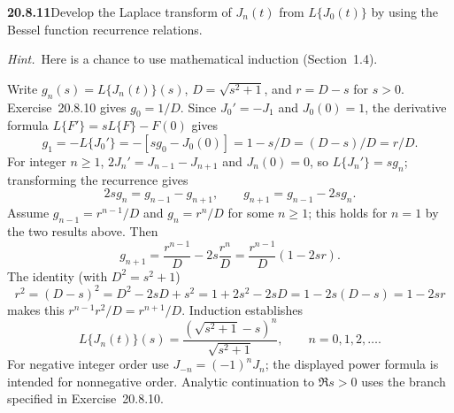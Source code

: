 \par\bigskip
\noindent\textbf{20.8.11}\quad Develop the Laplace transform of
$J_{n}(t)$ from $L\{J_{0}(t)\}$ by using the Bessel function
recurrence relations.
\par\emph{Hint.}~Here is a chance to use mathematical induction
(Section~1.4).
\par{}
\solution
Write $g_n(s)=L\{J_n(t)\}(s)$,
$D=\sqrt{s^2+1}$, and $r=D-s$ for $s>0$.
Exercise~20.8.10 gives $g_0=1/D$. Since $J_0'=-J_1$ and
$J_0(0)=1$, the derivative formula
$L\{F'\}=sL\{F\}-F(0)$ gives
\[
g_1=-L\{J_0'\}=-[sg_0-J_0(0)]=1-s/D=(D-s)/D=r/D.
\]
For integer $n\ge1$, $2J_n'=J_{n-1}-J_{n+1}$ and
$J_n(0)=0$, so $L\{J_n'\}=sg_n$; transforming the recurrence
gives
\[
2sg_n=g_{n-1}-g_{n+1},\qquad
g_{n+1}=g_{n-1}-2sg_n.
\]
Assume $g_{n-1}=r^{n-1}/D$ and $g_n=r^n/D$ for some $n\ge1$;
this holds for $n=1$ by the two results above. Then
\[
g_{n+1}=\frac{r^{n-1}}D-2s\frac{r^n}D
=\frac{r^{n-1}}D(1-2sr).
\]
The identity (with $D^2=s^2+1$)
\[
r^2=(D-s)^2=D^2-2sD+s^2
=1+2s^2-2sD=1-2s(D-s)=1-2sr
\]
makes this $r^{n-1}r^2/D=r^{n+1}/D$. Induction establishes
\[
\boxed{L\{J_n(t)\}(s)=
\frac{(\sqrt{s^2+1}-s)^n}{\sqrt{s^2+1}}},\qquad n=0,1,2,\ldots.
\]
For negative integer order use $J_{-n}=(-1)^nJ_n$;
the displayed power formula is intended for nonnegative order.
Analytic continuation to $\Re s>0$ uses the branch specified
in Exercise~20.8.10.

